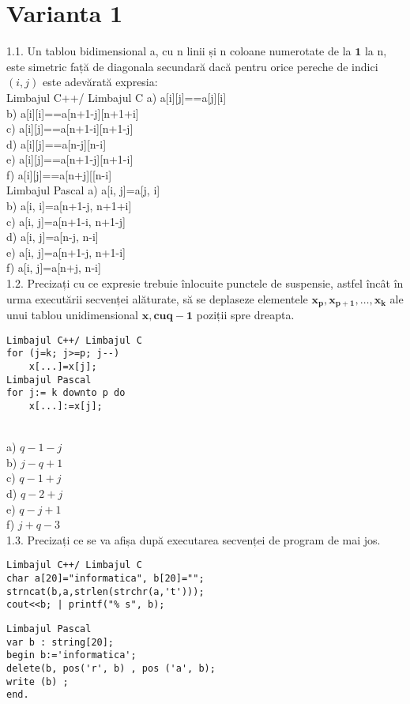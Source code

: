 \section*{Varianta 1}

1.1. Un tablou bidimensional a, cu n linii și n coloane numerotate de la $\mathbf{1}$ la n, este simetric față de diagonala secundară dacă pentru orice pereche de indici $(i, j)$ este adevărată expresia:
\\
Limbajul C++/ Limbajul C
a) a[i][j]==a[j][i]
\\
b) a[i][i]==a[n+1-j][n+1+i]
\\
c) a[i][j]==a[n+1-i][n+1-j]
\\
d) a[i][j]==a[n-j][n-i]
\\
e) a[i][j]==a[n+1-j][n+1-i]
\\
f) a[i][j]==a[n+j][[n-i]
\\
Limbajul Pascal
a) a[i, j]=a[j, i]
\\
b) a[i, i]=a[n+1-j, n+1+i]
\\
c) a[i, j]=a[n+1-i, n+1-j]
\\
d) a[i, j]=a[n-j, n-i]
\\
e) a[i, j]=a[n+1-j, n+1-i]
\\
f) a[i, j]=a[n+j, n-i]
\\
1.2. Precizați cu ce expresie trebuie înlocuite punctele de suspensie, astfel încât în urma executării secvenței alăturate, să se deplaseze elementele $\mathbf{x}_{\mathbf{p}}, \mathbf{x}_{\mathbf{p}+\mathbf{1}}, \ldots, \mathbf{x}_{\mathbf{k}}$ ale unui tablou unidimensional $\mathbf{x}, \mathbf{c u} \mathbf{q - 1}$ poziții spre dreapta.
\begin{verbatim}
Limbajul C++/ Limbajul C
for (j=k; j>=p; j--)
    x[...]=x[j];
Limbajul Pascal
for j:= k downto p do
    x[...]:=x[j];
\end{verbatim}
\\
a) $q-1-j$
\\
b) $j-q+1$
\\
c) $q-1+j$
\\
d) $q-2+j$
\\
e) $q-j+1$
\\
f) $j+q-3$
\\
1.3. Precizați ce se va afișa după executarea secvenței de program de mai jos.
\begin{verbatim}
Limbajul C++/ Limbajul C
char a[20]="informatica", b[20]="";
strncat(b,a,strlen(strchr(a,'t')));
cout<<b; | printf("% s", b);
\end{verbatim}
\begin{verbatim}
Limbajul Pascal
var b : string[20];
begin b:='informatica';
delete(b, pos('r', b) , pos ('a', b); 
write (b) ;
end.
\end{verbatim}
